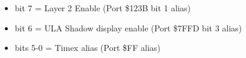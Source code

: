 \begin{itemize}
\item bit 7 = Layer 2 Enable (Port \$123B bit 1 alias)
\item bit 6 = ULA Shadow display enable (Port \$7FFD bit 3 alias)
\item bits 5-0 = Timex alias (Port \$FF alias)
\end{itemize}

